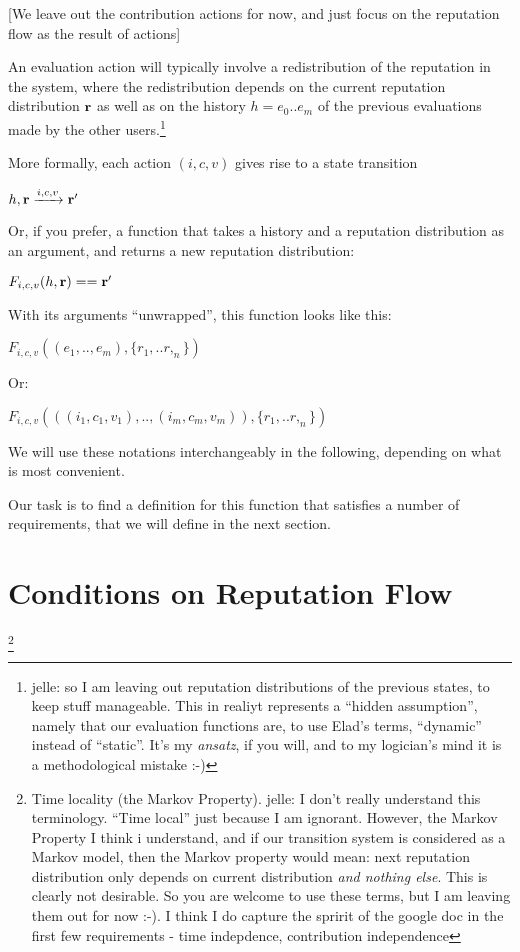\documentclass{article}
\begin{document}
[We leave out the contribution actions for now, and just focus on the reputation flow as the result of actions]


An evaluation action will typically involve a redistribution of the reputation in the system, where the redistribution depends on the current reputation distribution ${\bf r}$ as well as on the history $h = e_0 .. e_m$  of the previous evaluations made by the other users.\footnote{jelle: so I am leaving out reputation distributions of the previous states, to keep stuff manageable. This in realiyt represents a ``hidden assumption'', namely that our evaluation functions are, to use Elad's terms, ``dynamic'' instead of ``static''. It's my {\em ansatz}, if you will, and to my logician's mind it is a methodological mistake :-)}

More formally, each action $(i, c, v)$ gives rise to a state transition

\begin{center}
{ $h, {\bf r} \xrightarrow{i,c,v} {\bf r'}$ }
\end{center}
Or, if you prefer,  a function that takes a history and a reputation distribution as an argument, and returns a new reputation distribution:
\begin{center}
$F_{i,c,v}(h, {\bf r}) == {\bf r'}$
\end{center}
With its arguments ``unwrapped'', this function looks like this:
\begin{center}
$F_{i,c,v}((e_1, .. , e_m), \{r_1, .. r,_n\})$
\end{center}
Or:
\begin{center}
$F_{i,c,v}(((i_1,c_1,v_1), .. , (i_m, c_m, v_m)), \{r_1, .. r,_n\})$
\end{center}
We will use these notations interchangeably in the following, depending on what is most convenient.

Our task is to find a definition for this function that satisfies a number of requirements, that we will define in the next section.


\section{Conditions on Reputation Flow}

\footnote{Time locality (the Markov Property). jelle: I don't really understand this terminology. ``Time local'' just because I am ignorant. However, the Markov Property I think i understand, and if our transition system is considered as a Markov model, then the Markov property would mean: next reputation distribution only depends on current distribution {\em and nothing else}. This is clearly not desirable. So you are welcome to use these terms, but I am leaving them out for now :-). I think I do capture the spririt of the google doc in the first few requirements - time indepdence, contribution independence} 
\end{document}
